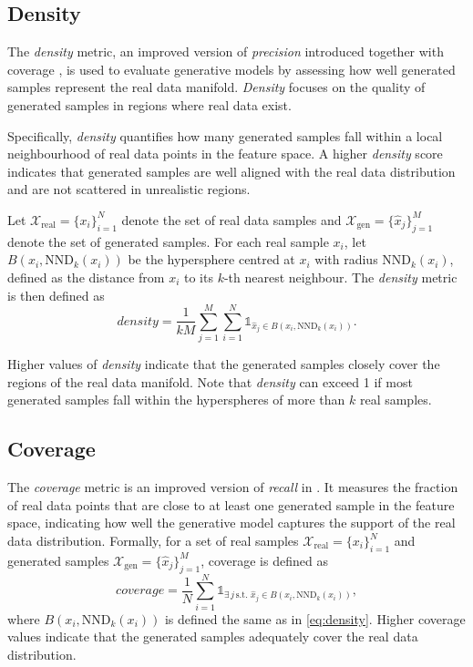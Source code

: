 \documentclass[journal]{IEEEtran}
\begin{document}
\subsection{Density}

The \textit{density} metric, an improved version of \textit{precision} \cite{precision_recall_distributions} introduced together with coverage \cite{density_coverage}, is used to evaluate generative models by assessing how well generated samples represent the real data manifold. \textit{Density} focuses on the quality of generated samples in regions where real data exist.

Specifically, \textit{density} quantifies how many generated samples fall within a local neighbourhood of real data points in the feature space. A higher \textit{density} score indicates that generated samples are well aligned with the real data distribution and are not scattered in unrealistic regions.

Let $\mathcal{X}_{\text{real}} = \{x_i\}_{i=1}^{N}$ denote the set of real data samples and $\mathcal{X}_{\text{gen}} = \{\hat{x}_j\}_{j=1}^{M}$ denote the set of generated samples. For each real sample $x_i$, let $B(x_i, \mathrm{NND}_k(x_i))$ be the hypersphere centred at $x_i$ with radius $\mathrm{NND}_k(x_i)$, defined as the distance from $x_i$ to its $k$-th nearest neighbour. The \textit{density} metric is then defined as
\begin{equation}\label{eq:density}
    \textit{density} = \frac{1}{kM} \sum_{j=1}^{M} \sum_{i=1}^{N} \mathds{1}_{\hat{x}_j \in B(x_i, \mathrm{NND}_k(x_i))}.
\end{equation}

Higher values of \textit{density} indicate that the generated samples closely cover the regions of the real data manifold. Note that \textit{density} can exceed 1 if most generated samples fall within the hyperspheres of more than $k$ real samples.

\subsection{Coverage}

The \textit{coverage} metric \cite{density_coverage} is an improved version of \textit{recall} in \cite{precision_recall_distributions}. It measures the fraction of real data points that are close to at least one generated sample in the feature space, indicating how well the generative model captures the support of the real data distribution. Formally, for a set of real samples $\mathcal{X}_{\text{real}} = \{x_i\}_{i=1}^{N}$ and generated samples $\mathcal{X}_{\text{gen}} = \{\hat{x}_j\}_{j=1}^{M}$, coverage is defined as
\begin{equation}\label{eq:coverage}
\textit{coverage} = \frac{1}{N} \sum_{i=1}^{N} \mathds{1}_{\exists \, j \, \text{s.t. } \hat{x}_j \in B(x_i, \mathrm{NND}_k(x_i))},
\end{equation}
where $B(x_i, \mathrm{NND}_k(x_i))$ is defined the same as in \ref{eq:density}. Higher coverage values indicate that the generated samples adequately cover the real data distribution.
\end{document}
